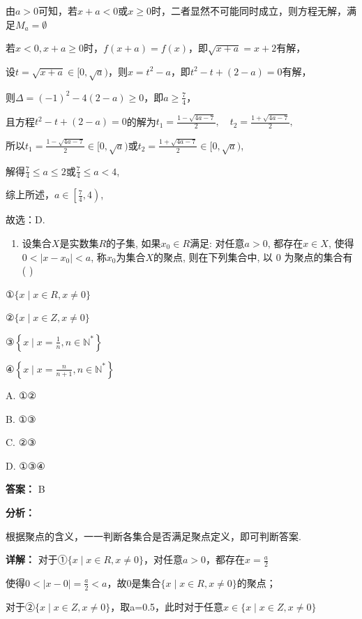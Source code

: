 \documentclass[11pt,a4paper]{ctexart}
\begin{document}
由\(a > 0\)可知，若\(x + a < 0\)或\(x \geq 0\)时，二者显然不可能同时成立，则方程无解，满足\(M_{a} = \emptyset\)

若\(x < 0, x + a \geq 0\)时，\(f(x + a) = f(x)\)，即\(\sqrt{x + a} = x + 2\)有解，

设\(t=\sqrt{x+a}\in[0,\sqrt a)\)，则\(x = t^2 - a\)，即\(t^2 - t + (2 - a) = 0\)有解，

则\(\Delta = (-1)^2 - 4(2 - a) \geq 0\)，即\(a \geq \frac{7}{4}\)，

且方程\(t^{2}-t+(2-a)=0\)的解为\(t_{1}=\frac{1-\sqrt{4a-7}}{2},\quad t_{2}=\frac{1+\sqrt{4a-7}}{2},\)

所以\(t_1=\frac{1-\sqrt{4a-7}}2\in[0,\sqrt a)\)或\(t_2=\frac{1+\sqrt{4a-7}}2\in[0,\sqrt a)\),

解得\(\frac{7}{4} \leq a \leq 2\)或\(\frac{7}{4} \leq a < 4\),

综上所述，\(a\in\left[\frac74,4\right)\),

故选：D.

\begin{enumerate}[label=\arabic*., leftmargin=*, start=21]
\item 设集合\(X\)是实数集\(R\)的子集, 如果\(x_0 \in R\)满足:
  对任意\(a > 0\), 都存在\(x \in X\), 使得\(0 < |x - x_0| < a\),
  称\(x_0\)为集合\(X\)的聚点, 则在下列集合中, 以 0 为聚点的集合有 ( )
\end{enumerate}

①\(\{x \mid x \in R, x \neq 0\}\)

②\(\{x \mid x \in Z, x \neq 0\}\)

③\(\left\{x\mid x=\frac{1}{n},n\in \mathbb{N}^{*}\right\}\)

④\(\left\{x\mid x=\frac{n}{n+1},n\in \mathbb{N}^{*}\right\}\)

A. ①②

B. ①③

C. ②③

D. ①③④

\textbf{答案：}
B

\textbf{分析：}

根据聚点的含义，一一判断各集合是否满足聚点定义，即可判断答案.

\textbf{详解：}
对于①\(\{x\mid x\in R,x\neq0\}\)，对任意\(a>0\)，都存在\(x=\frac{a}{2}\)

使得\(0 < |x - 0| = \frac{a}{2} < a\)，故0是集合\(\{x \mid x \in R, x \neq 0\}\)的聚点；

对于②\(\{x\mid x\in Z,x\neq0\}\)，取a=0.5，此时对于任意\(x\in\{x\mid x\in Z,x\neq0\}\)
\end{document}
